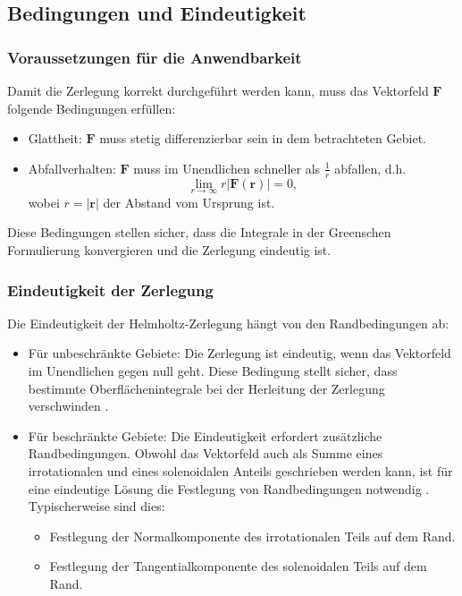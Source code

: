 \subsection{Bedingungen und Eindeutigkeit
\label{helmholtz:subsection:Bedingungen_Eindeutigkeit}}

\subsubsection{Voraussetzungen für die Anwendbarkeit}
Damit die Zerlegung korrekt durchgeführt werden kann, muss das Vektorfeld $\boldsymbol{F}$ folgende Bedingungen erfüllen:

\begin{itemize}
\item Glattheit: $\boldsymbol{F}$ muss stetig differenzierbar sein in dem betrachteten Gebiet.
\item Abfallverhalten: $\boldsymbol{F}$ muss im Unendlichen schneller als $\frac{1}{r}$ abfallen, d.h.
\begin{equation}
\lim_{r \to \infty} r|\boldsymbol{F}(\boldsymbol{r})| = 0,
\end{equation}
wobei $r = |\boldsymbol{r}|$ der Abstand vom Ursprung ist.
\end{itemize}
Diese Bedingungen stellen sicher, dass die Integrale in der Greenschen Formulierung konvergieren und die Zerlegung eindeutig ist.

\subsubsection{Eindeutigkeit der Zerlegung
\label{helmholtz:subsection:Bedingungen_onlyEindeutigkeit}}

Die Eindeutigkeit der Helmholtz-Zerlegung hängt von den Randbedingungen ab:

\begin{itemize}
\item Für unbeschränkte Gebiete: Die Zerlegung ist eindeutig, wenn das Vektorfeld im Unendlichen gegen null geht. Diese Bedingung stellt sicher, dass bestimmte Oberflächenintegrale bei der Herleitung der Zerlegung verschwinden \cite{wiki:helmholtz}.

\item Für beschränkte Gebiete: Die Eindeutigkeit erfordert zusätzliche Randbedingungen. Obwohl das Vektorfeld auch als Summe eines irrotationalen und eines solenoidalen Anteils geschrieben werden kann, ist für eine eindeutige Lösung die Festlegung von Randbedingungen notwendig \cite{wiki:helmholtz}. Typischerweise sind dies:
  \begin{itemize}
    \item Festlegung der Normalkomponente des irrotationalen Teils auf dem Rand.
    \item Festlegung der Tangentialkomponente des solenoidalen Teils auf dem Rand.
  \end{itemize}
\end{itemize}

